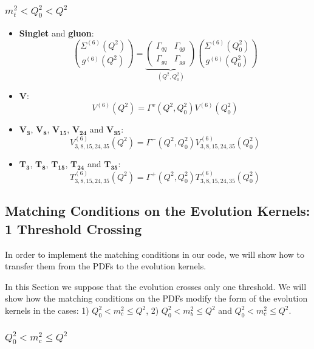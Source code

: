 \documentclass[10pt,a4paper]{article}
\begin{document}
\subsubsection{$m_t^2<Q_0^2<Q^2$}
\begin{itemize}
\item \textbf{Singlet} and \textbf{gluon}:
\begin{equation}
{\Sigma^{(6)}(Q^2) \choose g^{(6)}(Q^2)} =\underbrace{\begin{pmatrix} \Gamma_{qq}& \Gamma_{qg} \\ \Gamma_{gq}& \Gamma_{gg}\end{pmatrix}}_{(Q^2,Q_0^2)}{\Sigma^{(6)}(Q_0^2) \choose g^{(6)}(Q_0^2)}
\end{equation}
\item $\mathbf{V}$:
\begin{equation}
V^{(6)}(Q^2)=\Gamma^{v}(Q^2,Q_0^2)V^{(6)}(Q^2_0)
\end{equation}
\item $\mathbf{V_3}$, $\mathbf{V_8}$, $\mathbf{V_{15}}$, $\mathbf{V_{24}}$ and $\mathbf{V_{35}}$:
\begin{equation}
V^{(6)}_{3,8,15,24,35}(Q^2)=\Gamma^{-}(Q^2,Q_0^2)V^{(6)}_{3,8,15,24,35}(Q^2_0)
\end{equation}
\item $\mathbf{T_3}$, $\mathbf{T_8}$, $\mathbf{T_{15}}$, $\mathbf{T_{24}}$ and $\mathbf{T_{35}}$:
\begin{equation}
T^{(6)}_{3,8,15,24,35}(Q^2)=\Gamma^{+}(Q^2,Q_0^2)T^{(6)}_{3,8,15,24,35}(Q^2_0)
\end{equation}
\end{itemize}


\subsection{Matching Conditions on the Evolution Kernels: 1 Threshold Crossing}

In order to implement the matching conditions in our code, we will
show how to transfer them from the PDFs to the evolution kernels.

In this Section we suppose that the evolution crosses only one
threshold. We will show how the matching conditions on the PDFs modify
the form of the evolution kernels in the cases: 1)
$Q_0^2<m_c^2\leq Q^2$, 2) $Q_0^2<m_b^2\leq Q^2$ and
$Q_0^2<m_c^2\leq Q^2$.

\subsubsection{$Q_0^2<m_c^2\leq Q^2$}
\end{document}
